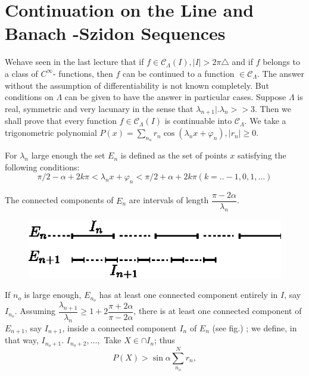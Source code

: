 \chapter{Continuation on the Line and Banach -Szidon
  Sequences}\label{chap18} %

We\pageoriginale have seen in the last lecture that if $f \in \mathscr{C}_\Lambda
(I), | I | > 2 \pi \triangle$ and if $f$ belongs to a class of
$C^\infty$- functions, then $f$ can be continued to a function $\in
\mathscr{C}_\Lambda$. The answer without the assumption of
differentiability is not known completely. But conditions on $\Lambda$
can be given to have the answer in particular cases. Suppose $\Lambda$
is real, symmetric and very lacunary in the sense that $\lambda_{n +
 1}|. \lambda_n >> 3$. Then we shall prove that every function $f \in
\mathscr{C}_\Lambda (I)$ is continuable into $\mathscr{C}_\Lambda$. We
take a trigonometric polynomial $P(x) = \sum\limits_{n_o} r_n \cos
(\lambda_n x + \varphi_n), \big | r_n \big | \ge 0$. 

For $\lambda_n$ large enough the set $E_n$ is defined as the set of
points $x$ satisfying the following conditions: 
$$
\pi/2 - \alpha + 2 k \pi < \lambda_n x+ \varphi_n < \pi/2 + \alpha + 2
k \pi (k =. . - 1, 0, 1, \ldots) 
$$

The connected components of $E_n$ are intervals of length
$\dfrac{\pi - 2 \alpha}{\lambda_n}$. 

\begin{figure}[H]
 \centerline{\includegraphics{vol15-figures/fig15-20a.eps}}
\end{figure}

If $n_o$ is large enough, $E_{n_o} $ has at least one connected
component entirely in $I$, say $I_{n_o}$. Assuming $\dfrac{\lambda_
{n+1}}{\lambda_n} \ge 1 + 2 \dfrac{\pi + 2 \alpha}{\pi - 2 \alpha}$,
there is at least one connected component of $E_{n + 1}$, say $I_{n +1
}$, inside a connected component $I_n $ of $E_n$ (see fig.) ; we
define, in that way, $I_{n_o+1}$. $I_{n_o + 2}, \ldots, $ Take $X \in
\cap I_n $; thus 
\begin{equation}
 P(X) > \sin \alpha \sum^N_{n_o} r_n, \tag{1}\label{chap18:eq1}
\end{equation}

